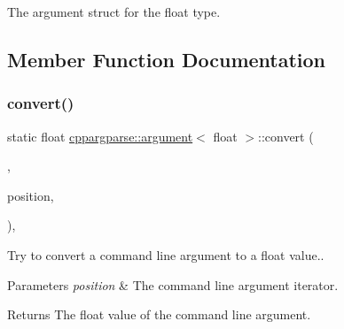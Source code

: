 The argument struct for the float type. 

\subsection{Member Function Documentation}
\mbox{\label{structcppargparse_1_1argument_3_01float_01_4_a3dd5dba91fc35f277138619066d7db24}} 
\subsubsection{\texorpdfstring{convert()}{convert()}}
{\footnotesize\ttfamily static float \hyperlink{structcppargparse_1_1argument}{cppargparse\+::argument}$<$ float $>$\+::convert (\begin{DoxyParamCaption}\item[{const types\+::\+Command\+Line\+\_\+t \&}]{,  }\item[{const types\+::\+Command\+Line\+Position\+\_\+t \&}]{position,  }\item[{const types\+::\+Command\+Line\+Arguments\+\_\+t \&}]{ }\end{DoxyParamCaption})\hspace{0.3cm}{\ttfamily [inline]}, {\ttfamily [static]}}



Try to convert a command line argument to a float value.. 


\begin{DoxyParams}{Parameters}
{\em position} & The command line argument iterator.\\
\hline
\end{DoxyParams}
\begin{DoxyReturn}{Returns}
The float value of the command line argument. 
\end{DoxyReturn}
\mbox{\label{structcppargparse_1_1argument_3_01float_01_4_a6c02321d1fcc25ffa950948ab642e64f}} 
